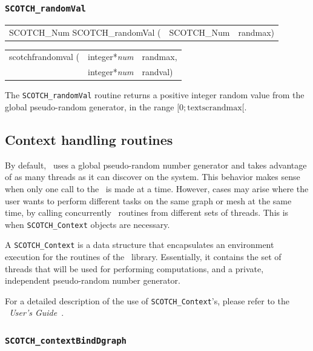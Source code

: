 \subsubsection{{\tt SCOTCH\_randomVal}}

\begin{itemize}
\progsyn

{\tt\begin{tabular}{l@{}ll}
SCOTCH\_Num SCOTCH\_randomVal ( & SCOTCH\_Num & randmax)
\end{tabular}}

{\tt\begin{tabular}{l@{}ll}
scotchfrandomval ( & integer*{\it num} & randmax, \\
                   & integer*{\it num} & randval)
\end{tabular}}

\progdes

The {\tt SCOTCH\_randomVal} routine returns a positive integer random
value from the global pseudo-random generator, in the range
$[0;\mbox{textsc{randmax}}[$.
\end{itemize}

\subsection{Context handling routines}
\label{sec-lib-func-context}

By default, \scotch\ uses a global pseudo-random number generator and
takes advantage of as many threads as it can discover on the
system. This behavior makes sense when only one call to the
\libscotch\ is made at a time. However, cases may arise where the user
wants to perform different tasks on the same graph or mesh at the same
time, by calling concurrently \libscotch\ routines from different sets
of threads. This is when \texttt{SCOTCH\_\lbt Context} objects are
necessary.

A \texttt{SCOTCH\_\lbt Context} is a data structure that encapsulates
an environment execution for the routines of the
\libscotch\ library. Essentially, it contains the set of threads that
will be used for performing computations, and a private, independent
pseudo-random number generator.

For a detailed description of the use of \texttt{SCOTCH\_\lbt Context}'s,
please refer to the {\it\scotch\ User's Guide}~\scotchcitesuser.

\subsubsection{\texttt{SCOTCH\_contextBindDgraph}}

